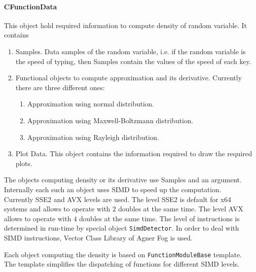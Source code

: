 \documentclass{article}
\begin{document}
\paragraph{CFunctionData}

This object hold required information to compute density of random variable. It contains
\begin{enumerate}
\item Samples. Data samples of the random variable, i.e. if the random variable is the speed of typing, then Samples contain the values of the speed of each key.
\item Functional objects to compute approximation and its derivative. Currently there are three different ones:
\begin{enumerate}
\item Approximation using normal distribution. 
\item Approximation using Maxwell-Boltzmann distribution.
\item Approximation using Rayleigh distribution.
\end{enumerate}
\item Plot Data. This object contains the information required to draw the required plots.
\end{enumerate}

The objects computing density or its derivative use Samples and an argument. Internally each such an object uses SIMD to speed up the computation. Currently SSE2 and AVX levels are used. The level SSE2 is default for x64 systems and allows to operate with $2$ doubles at the same time. The level AVX allows to operate with $4$ doubles at the same time. The level of instructions is determined in run-time by special object \verb"SimdDetector". In order to deal with SIMD instructions, Vector Class Library of Agner Fog is used.

Each object computing the density is based on \verb"FunctionModuleBase" template. The template simplifies the dispatching of functions for different SIMD levels.
\end{document}
